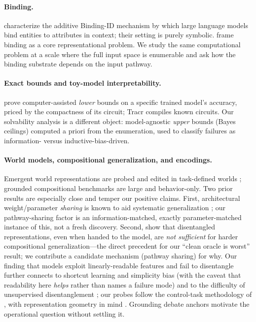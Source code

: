 \documentclass[10pt]{article} %
\begin{document}
\paragraph{Binding.} \citet{feng2024how} characterize the additive Binding-ID mechanism by which
large language models bind entities to attributes in context; their setting is purely symbolic.
\citet{greff2020binding} frame binding as a core representational problem. We study the same
computational problem at a scale where the full input space is enumerable and ask how the binding
substrate depends on the input pathway.

\paragraph{Exact bounds and toy-model interpretability.} \citet{gross2024compact} prove
computer-assisted \emph{lower} bounds on a specific trained model's accuracy, priced by the
compactness of its circuit; Tracr \citep{lindner2023tracr} compiles known circuits. Our solvability
analysis is a different object: model-agnostic \emph{upper} bounds (Bayes ceilings) computed a
priori from the enumeration, used to classify failures as information- versus inductive-bias-driven.

\paragraph{World models, compositional generalization, and encodings.} Emergent world
representations are probed and edited in task-defined worlds \citep{li2023emergent}; grounded
compositional benchmarks \citep{lake2018generalization,ruis2020benchmark,kim2020cogs} are large and
behavior-only. Two prior results are especially close and temper our positive claims. First,
architectural weight/parameter \emph{sharing} is known to aid systematic generalization
\citep{csordas2021devil}; our pathway-sharing factor is an information-matched, exactly
parameter-matched instance of this, not a fresh discovery. Second, \citet{montero2021role} show
that disentangled representations, even when handed to the model, are \emph{not sufficient} for
harder compositional generalization---the direct precedent for our ``clean oracle is worst''
result; we contribute a candidate mechanism (pathway sharing) for why. Our finding that models
exploit linearly-readable features and fail to disentangle further connects to shortcut learning
and simplicity bias \citep{geirhos2020shortcut,shah2020pitfalls,hermann2020shapes} (with the
caveat that readability here \emph{helps} rather than names a failure mode) and to the difficulty
of unsupervised disentanglement \citep{locatello2019challenging}; our probes follow the control-task methodology of
\citet{hewitt2019designing}, with representation geometry in mind \citep{elhage2022toy}. Grounding
debate anchors \citep{bender2020climbing,bisk2020experience,merrill2021provable,patel2022mapping}
motivate the operational question without settling it.
\end{document}
